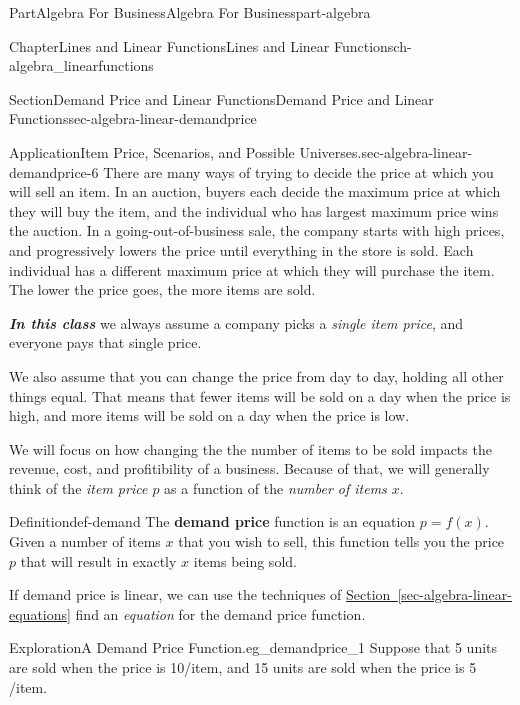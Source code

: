 \documentclass{tufte-book}
\newcommand{\xreffont}{\relax}
\newcommand{\alert}[1]{\textbf{\textit{#1}}}
\newcommand{\terminology}[1]{\textbf{#1}}
\numberwithin{equation}{chapter}
\begin{document}
\begin{partptx}{Part}{Algebra For Business}{}{Algebra For Business}{}{}{part-algebra}
\begin{chapterptx}{Chapter}{Lines and Linear Functions}{}{Lines and Linear Functions}{}{}{ch-algebra_linearfunctions}
\begin{sectionptx}{Section}{Demand Price and Linear Functions}{}{Demand Price and Linear Functions}{}{}{sec-algebra-linear-demandprice}
\begin{insight}{Application}{Item Price, Scenarios, and Possible Universes.}{sec-algebra-linear-demandprice-6}
There are many ways of trying to decide the price at which you will sell an item. In an auction, buyers each decide the maximum price at which they will buy the item, and the individual who has largest maximum price wins the auction. In a going-out-of-business sale, the company starts with high prices, and progressively lowers the price until everything in the store is sold. Each individual has a different maximum price at which they will purchase the item.  The lower the price goes, the more items are sold.%
\par
\alert{In this class} we always assume a company picks a \emph{single item price}, and everyone pays that single price.%
\par
We also assume that you can change the price from day to day, holding all other things equal.  That means that fewer items will be sold on a day when the price is high, and more items will be sold on a day when the price is low.%
\end{insight}
We will  focus on how changing the the number of items to be sold impacts the revenue, cost, and profitibility of a business. Because of that, we will generally think of the \emph{item price \(p\)}  as a function of the \emph{number of items \(x\)}.%
\begin{definition}{Definition}{}{def-demand}%
The \terminology{demand price} function is an equation \(p = f(x)\). Given a number of items \(x\) that you wish to sell, this function tells you the price \(p\) that will result in exactly \(x\) items being sold.%
\end{definition}
If demand price is linear, we can use the techniques of \hyperref[sec-algebra-linear-equations]{Section~{\xreffont\ref{sec-algebra-linear-equations}}} find an \emph{equation} for the demand price function.%
\begin{exploration}{Exploration}{A Demand Price Function.}{eg_demandprice_1}%
Suppose that 5 units are sold when the price is 10\textdollar{}\slash{}item, and 15 units are sold when the price is 5 \textdollar{}\slash{}item.%
\begin{image}{0}{1}{0}{}%
\end{image}
\end{exploration}
\end{sectionptx}
\end{chapterptx}
\end{partptx}
\end{document}
